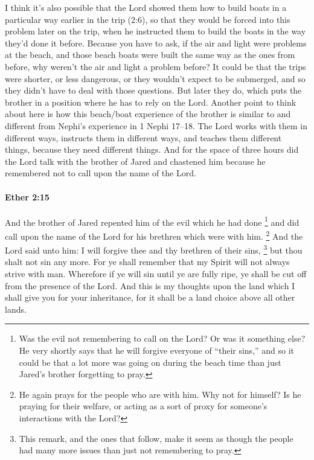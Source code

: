 {				I think it's also possible that the Lord showed them how to build boats in a particular way earlier in the trip (2:6), so that they would be forced into this problem later on the trip, when he instructed them to build the boats in the way they'd done it before. Because you have to ask, if the air and light were problems at the beach, and those beach boats were built the same way as the ones from before, why weren't the air and light a problem before? It could be that the trips were shorter, or less dangerous, or they wouldn't expect to be submerged, and so they didn't have to deal with those questions. But later they do, which puts the brother in a position where he has to rely on the Lord. 
				Another point to think about here is how this beach/boat experience of the brother is similar to and different from Nephi's experience in 1 Nephi 17--18. The Lord works with them in different ways, instructs them in different ways, and teaches them different things, because they need different things.
				}%
			And for the space of three hours did the Lord talk with the brother of Jared
			and chastened him because he remembered not to call upon the name of the Lord.

		\paragraph{Ether 2:15} %
			\label{ETHER-2-15}

			And the brother of Jared repented him of the evil which he had done%
				\footnote{%
					Was the evil not remembering to call on the Lord? Or was it something else? He very shortly says that he will forgive everyone of ``their sins,'' and so it could be that a lot more was going on during the beach time than just Jared's brother forgetting to pray.
					}
			and did call upon the name of the Lord
			for his brethren which were with him.%
				\footnote{%
					He again prays for the people who are with him. Why not for himself? Is he praying for their welfare, or acting as a sort of proxy for someone's interactions with the Lord?
					}
			And the Lord said unto him:
			I will forgive thee and thy brethren of their sins,%
				\footnote{%
					This remark, and the ones that follow, make it seem as though the people had many more issues than just not remembering to pray.
					}
			but thou shalt not sin any more.
			For ye shall remember that my Spirit will not always strive with man.
			Wherefore if ye will sin until ye are fully ripe,
			ye shall be cut off from the presence of the Lord.
			And this is my thoughts upon the land
			which I shall give you for your inheritance,
			for it shall be a land choice above all other lands.

